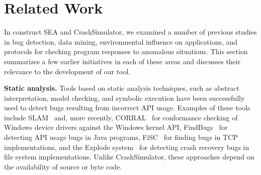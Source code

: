 \section{Related Work}
\label{SEC:related-work}

In construct SEA and CrashSimulator, we examined a number of previous
studies in bug detection, data mining, environmental influence on
applications, and protocols for checking program responses to anomalous
situations. This section
summarizes a few earlier initiatives in each of these areas and discusses
their relevance to the development of our tool.



\iffalse
While there is a vast literature on test
generation~\cite{ammann2008introduction, mcminn2004search,
  puasuareanu2009survey, dias2007survey}, much less work
has focused on issues of portability and testing whether software
behaves consistently in different environments.  Prior work on
CheckAPI~\cite{rasley2015detecting} and
NetCheck~\cite{Zhuang_NSDI_2014} begins to fill this gap and this paper
builds upon those results.
%
%


Crash reproduction by test case mutation~\cite{DBLP:conf/sigsoft/XuanXM15}.

\fi


\noindent
{\bf Static analysis. }
\label{rel-static-analysis}
Tools based on static analysis techniques, such as abstract interpretation,
model checking, and symbolic execution have been successfully
used to
detect bugs resulting from incorrect API usage. Examples of these tools
include
SLAM~\cite{Ball_adecade, Ball:2002:SLP:503272.503274} and, more recently,
CORRAL~\cite{DBLP:conf/sigsoft/LalQ14} for conformance checking of Windows
device drivers against the Windows kernel API,
FindBugs~\cite{DBLP:conf/oopsla/HovemeyerP04} for detecting API usage bugs
in Java programs, FiSC~\cite{Musuvathi04modelchecking} for finding bugs in
TCP implementations, and the Explode
system~\cite{Yang:2006:ELG:1298455.1298469} for detecting crash recovery
bugs in file system implementations. Unlike CrashSimulator, these
approaches depend on the availability of source or byte code.

